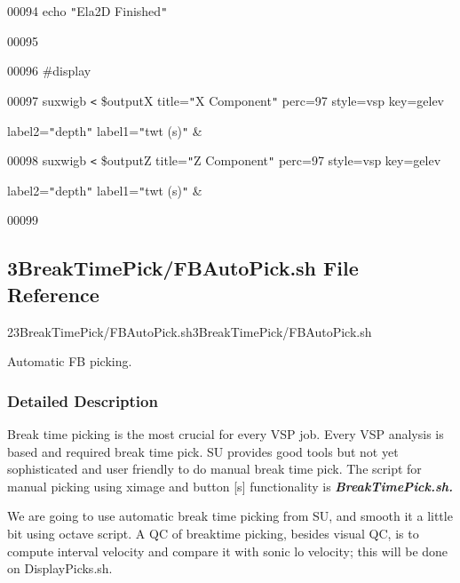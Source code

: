 \documentclass{article}
\begin{document}
\vspace{4pt}
00094 echo \texttt{"}Ela2D Finished\texttt{"}

\vspace{4pt}
00095 

\vspace{4pt}
00096 \#display

\vspace{4pt}
00097 suxwigb \texttt{<} \$outputX title=\texttt{"}X Component\texttt{"} perc=97 
style=vsp key=gelev 

\vspace{4pt}
\parindent=18pt
label2=\texttt{"}depth\texttt{"} label1=\texttt{"}twt (s)\texttt{"} \&

\vspace{4pt}
\parindent=0pt
00098 suxwigb \texttt{<} \$outputZ title=\texttt{"}Z Component\texttt{"} perc=97 
style=vsp key=gelev 

\vspace{4pt}
\parindent=18pt
label2=\texttt{"}depth\texttt{"} label1=\texttt{"}twt (s)\texttt{"} \&

\vspace{4pt}
\parindent=0pt
00099 \pagebreak{}

\vspace{24pt}
\subsection*{{\large{}\textbf{3BreakTimePick/FBAutoPick.sh File Reference}}}

\vspace{12pt}
23BreakTimePick/FBAutoPick.sh3BreakTimePick/FBAutoPick.sh\label{AAAAAAAAAI}

\vspace{12pt}
Automatic FB picking. 

\vspace{24pt}
\subsubsection*{\textbf{Detailed Description}}

\vspace{1pt}
Break time picking is the most crucial for every VSP job. Every VSP analysis is 
based and required break time pick. SU provides good tools but not yet sophisticated 
and user friendly to do manual break time pick. The script for manual picking using 
ximage and button [s] functionality is \textit{\textbf{BreakTimePick.sh.}} 

\vspace{1pt}
We are going to use automatic break time picking from SU, and smooth it a little 
bit using octave script. A QC of breaktime picking, besides visual QC, is to compute 
interval velocity and compare it with sonic lo velocity; this will be done on DisplayPicks.sh.
\end{document}

